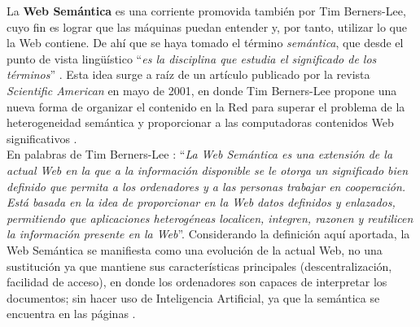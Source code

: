 La \textbf{Web Semántica} es una corriente promovida también por Tim Berners-Lee, cuyo fin es lograr que las máquinas puedan entender y, por tanto, utilizar lo que la Web contiene. De ahí que se haya tomado el término \textit{semántica}, que desde el punto de vista lingüístico ``\textit{es la disciplina que estudia el significado de los términos}'' \cite{cwb}. Esta idea surge a raíz de un artículo publicado por la revista \textit{Scientific American} en mayo de 2001, en donde Tim Berners-Lee propone una nueva forma de organizar el contenido en la Red para superar el problema de la heterogeneidad semántica y proporcionar a las computadoras contenidos Web significativos \cite{web-semantica-w3c, libro-gis}.\\







En palabras de Tim Berners-Lee \cite{researchgate}: ``\textit{La Web Semántica es una extensión de la actual Web en la que a la información disponible se le otorga un significado bien definido que permita a los ordenadores y a las personas trabajar en cooperación. Está basada en la idea de proporcionar en la Web datos definidos y enlazados, permitiendo que aplicaciones heterogéneas localicen, integren, razonen y reutilicen la información presente en la Web}''. Considerando la definición aquí aportada, la Web Semántica se manifiesta como una evolución de la actual Web, no una sustitución ya que mantiene sus características principales (descentralización, facilidad de acceso), en donde los ordenadores son capaces de interpretar los documentos; sin hacer uso de Inteligencia Artificial, ya que la semántica se encuentra en las páginas \cite{semantica-web}. \\



